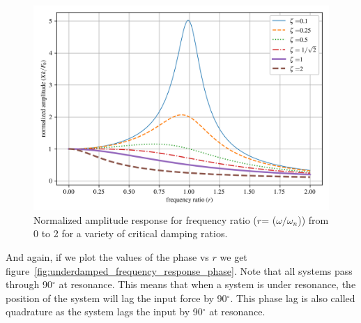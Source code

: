 \documentclass[12pt,letter]{article}
\begin{document}
	\begin{figure}[H]
		\centering
		\includegraphics[]{../figures/underdamped_frequency_response_amplitude.png}
		\caption{Normalized amplitude response for frequency ratio ($r$= ($\omega/\omega_n$)) from 0 to 2 for a variety of critical damping ratios.}
		\label{fig:underdamped_frequency_response_amplitude}
	\end{figure}
	\noindent And again, if we plot the values of the phase vs $r$ we get figure~\ref{fig:underdamped_frequency_response_phase}. Note that all systems pass through 90$^\circ$ at resonance. This means that when a system is under resonance, the position of the system will lag the input force by 90$^\circ$. This phase lag is also called quadrature as the system lags the input by 90$^\circ$ at resonance.
	
\end{document}
